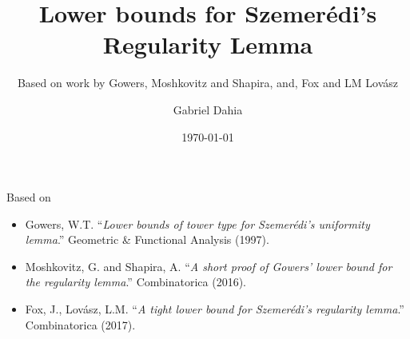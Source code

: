 \documentclass{beamer}
\title{Lower bounds for Szemer\'{e}di's Regularity Lemma}
\subtitle{Based on work by Gowers, Moshkovitz and Shapira, and, Fox and LM Lov\'{a}sz}
\author{Gabriel Dahia}
\institute{IMPA}
\date{\today}
\begin{document}
\beamertemplatenavigationsymbolsempty

\begin{frame}
  \titlepage
\end{frame}

\begin{frame}{Based on}
  \begin{itemize}
    \item Gowers, W.T. ``\textit{Lower bounds of tower type for Szemerédi’s uniformity
            lemma}.'' Geometric \& Functional Analysis (1997).
    \item Moshkovitz, G. and Shapira, A. ``\textit{A short proof of Gowers’ lower bound
            for the regularity lemma}.'' Combinatorica (2016).
    \item Fox, J., Lov\'{a}sz, L.M. ``\textit{A tight lower bound for
          Szemer\'{e}di’s regularity lemma}.'' Combinatorica (2017).
  \end{itemize}
\end{frame}
\end{document}
